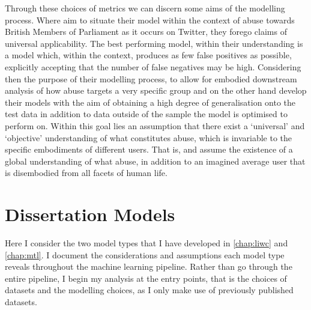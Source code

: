 Through these choices of metrics we can discern some aims of the modelling process.
Where \citet{Gorrell:2018} aim to situate their model within the context of abuse towards British Members of Parliament as it occurs on Twitter, they forego claims of universal applicability.
The best performing model, within their understanding is a model which, within the context, produces as few false positives as possible, explicitly accepting that the number of false negatives may be high.
Considering then the purpose of their modelling process,  to allow for embodied downstream analysis of how abuse targets a very specific group
\citet{Wulczyn:2016} and \citet{Kshirsagar:2018} on the other hand develop their models with the aim of obtaining a high degree of generalisation onto the test data in addition to data outside of the sample the model is optimised to perform on.
Within this goal lies an assumption that there exist a `universal' and  `objective' understanding of what constitutes abuse, which is invariable to the specific embodiments of different users. 
That is, \citet{Wulczyn:2016} and \citet{Kshirsagar:2018} assume the existence of a global understanding of what  abuse, in addition to an imagined average user that is disembodied from all facets of human life.

\section{Dissertation Models}
Here I consider the two model types that I have developed in \autoref{chap:liwc} and \autoref{chap:mtl}.
I document the considerations and assumptions each model type reveals throughout the machine learning pipeline.
Rather than go through the entire pipeline, I begin my analysis at the entry points, that is the choices of datasets and the modelling choices, as I only make use of previously published datasets.

